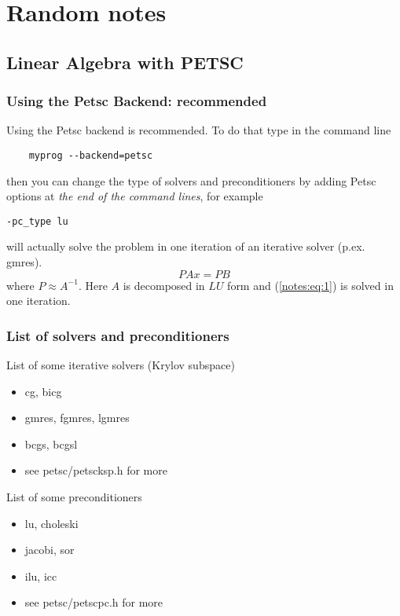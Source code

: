 \chapter{Random notes}
\label{cha:random-notes}

\section{Linear Algebra with PETSC}

\subsection{Using the Petsc Backend: recommended}

Using the Petsc backend is recommended. To do that type in the command line
\begin{lstlisting}
    myprog --backend=petsc
  \end{lstlisting}
  then you can change the type of solvers and preconditioners by
  adding Petsc options at \emph{the end of the command lines}, for example
\begin{verbatim}
-pc_type lu
\end{verbatim}
  will actually solve the problem in one iteration of an iterative solver
  (p.ex. gmres).
  \begin{equation}
    \label{notes:eq:1}
    P A x = P B
  \end{equation}
  where $P \approx A^{-1}$. Here $A$ is decomposed in $LU$ form and
  (\ref{notes:eq:1}) is solved in one iteration.

\subsection{List of solvers and preconditioners}
\label{sec:list-solv-prec}

List of some iterative solvers (Krylov subspace)
\begin{itemize}
\item cg, bicg
\item gmres, fgmres, lgmres
\item bcgs, bcgsl
\item see petsc/petscksp.h for more
\end{itemize}

List of some preconditioners
\begin{itemize}
\item lu, choleski
\item jacobi, sor
\item ilu, icc
\item see petsc/petscpc.h for more
\end{itemize}

